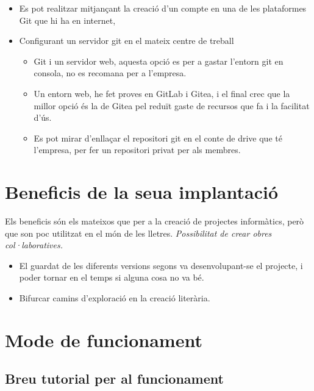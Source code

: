 \documentclass[
  10pt,
]{krantz}
\providecommand{\tightlist}{%
  \setlength{\itemsep}{0pt}\setlength{\parskip}{0pt}}
\begin{document}
\begin{itemize}
\tightlist
\item
  Es pot realitzar mitjançant la creació d'un compte en una de les plataformes Git que hi ha en internet,
\item
  Configurant un servidor git en el mateix centre de treball

  \begin{itemize}
  \tightlist
  \item
    Git i un servidor web, aquesta opció es per a gastar l'entorn git en consola, no es recomana per a l'empresa.
  \item
    Un entorn web, he fet proves en GitLab i Gitea, i el final crec que la millor opció és la de Gitea pel reduït gaste de recursos que fa i la facilitat d'ús.
  \item
    Es pot mirar d'enllaçar el repositori git en el conte de drive que té l'empresa, per fer un repositori privat per als membres.
  \end{itemize}
\end{itemize}

\hypertarget{beneficis-de-la-seua-implantaciuxf3}{%
\section{Beneficis de la seua implantació}\label{beneficis-de-la-seua-implantaciuxf3}}

Els beneficis són els mateixos que per a la creació de projectes informàtics, però que son poc utilitzat en el món de les lletres. \emph{Possibilitat de crear obres col·laboratives.}

\begin{itemize}
\tightlist
\item
  El guardat de les diferents versions segons va desenvolupant-se el projecte, i poder tornar en el temps si alguna cosa no va bé.
\item
  Bifurcar camins d'exploració en la creació literària.
\end{itemize}

\hypertarget{mode-de-funcionament}{%
\section{Mode de funcionament}\label{mode-de-funcionament}}

\hypertarget{breu-tutorial-per-al-funcionament}{%
\subsection{Breu tutorial per al funcionament}\label{breu-tutorial-per-al-funcionament}}
\end{document}
